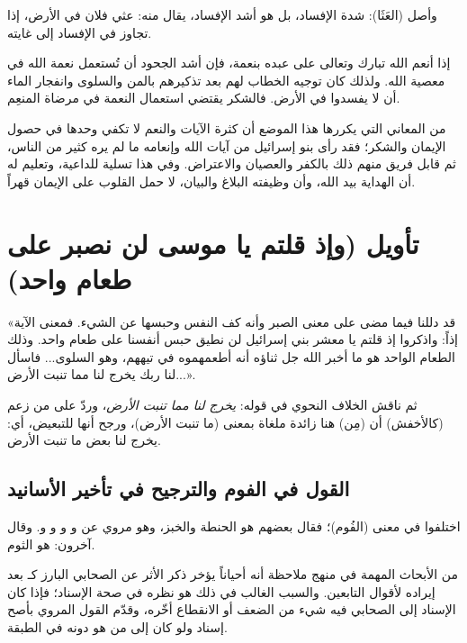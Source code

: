 وأصل (العَثَا): شدة الإفساد، بل هو أشد الإفساد، يقال منه: عثي فلان في الأرض، إذا تجاوز في الإفساد إلى غايته.

\begin{fawaid}
إذا أنعم الله تبارك وتعالى على عبده بنعمة، فإن أشد الجحود أن تُستعمل نعمة الله في معصية الله. ولذلك كان توجيه الخطاب لهم بعد تذكيرهم بالمن والسلوى وانفجار الماء أن لا يفسدوا في الأرض. فالشكر يقتضي استعمال النعمة في مرضاة المنعِم.
\end{fawaid}

\begin{fawaid}
من المعاني التي يكررها هذا الموضع أن كثرة الآيات والنعم لا تكفي وحدها في حصول الإيمان والشكر؛ فقد رأى بنو إسرائيل من آيات الله وإنعامه ما لم يره كثير من الناس، ثم قابل فريق منهم ذلك بالكفر والعصيان والاعتراض. وفي هذا تسلية للداعية، وتعليم له أن الهداية بيد الله، وأن وظيفته البلاغ والبيان، لا حمل القلوب على الإيمان قهراً.
\end{fawaid}

\separator

\section{تأويل (وإذ قلتم يا موسى لن نصبر على طعام واحد)}
 «قد دللنا فيما مضى على معنى الصبر وأنه كف النفس وحبسها عن الشيء. فمعنى الآية إذاً: واذكروا إذ قلتم يا معشر بني إسرائيل لن نطيق حبس أنفسنا على طعام واحد. وذلك الطعام الواحد هو ما أخبر الله جل ثناؤه أنه أطعمهموه في تيههم، وهو السلوى... فاسأل لنا ربك يخرج لنا مما تنبت الأرض...».

ثم ناقش  الخلاف النحوي في قوله: \textit{يخرج لنا مما تنبت الأرض}، وردّ على من زعم (كالأخفش) أن (مِن) هنا زائدة ملغاة بمعنى (ما تنبت الأرض)، ورجح أنها للتبعيض، أي: يخرج لنا بعض ما تنبت الأرض.

\subsection{القول في الفوم والترجيح في تأخير الأسانيد}
اختلفوا في معنى (الفُوم)؛ فقال بعضهم هو الحنطة والخبز، وهو مروي عن  و و و و. وقال آخرون: هو الثوم.

\begin{fawaid}
من الأبحاث المهمة في منهج  ملاحظة أنه أحياناً يؤخر ذكر الأثر عن الصحابي البارز كـ  بعد إيراده لأقوال التابعين. والسبب الغالب في ذلك هو نظره في صحة الإسناد؛ فإذا كان الإسناد إلى الصحابي فيه شيء من الضعف أو الانقطاع أخّره، وقدّم القول المروي بأصح إسناد ولو كان إلى من هو دونه في الطبقة.
\end{fawaid}

